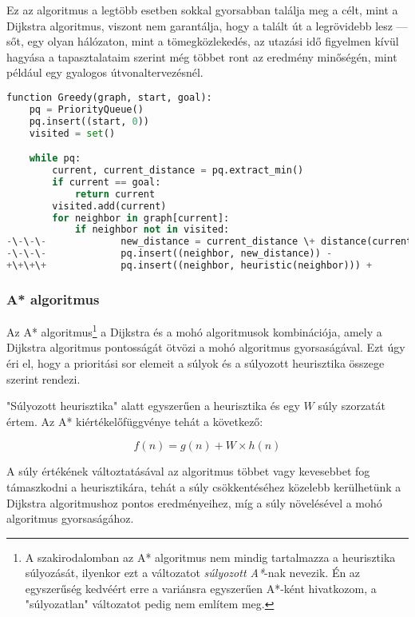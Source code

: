 Ez az algoritmus a legtöbb esetben sokkal gyorsabban találja meg a célt, mint a Dijkstra algoritmus, viszont nem garantálja, hogy a talált út a legrövidebb lesz --- sőt, egy olyan hálózaton, mint a tömegközlekedés, az utazási idő figyelmen kívül hagyása a tapasztalataim szerint még többet ront az eredmény minőségén, mint például egy gyalogos útvonaltervezésnél.

\begin{lstlisting}[language={Python}, style=gitdiff]
function Greedy(graph, start, goal):
    pq = PriorityQueue()
    pq.insert((start, 0))
    visited = set()

    while pq:
        current, current_distance = pq.extract_min()
        if current == goal:
            return current
        visited.add(current)
        for neighbor in graph[current]:
            if neighbor not in visited:
-\-\-\-             new_distance = current_distance \+ distance(current, neighbor) -
-\-\-\-             pq.insert((neighbor, new_distance)) -
+\+\+\+             pq.insert((neighbor, heuristic(neighbor))) +
\end{lstlisting}

\subsubsection{A* algoritmus}

Az A* algoritmus\footnote{A szakirodalomban az A* algoritmus nem mindig tartalmazza a heurisztika súlyozását, ilyenkor ezt a változatot \textit{súlyozott A*}-nak nevezik\cite{russell2020artificial}. Én az egyszerűség kedvéért erre a variánsra egyszerűen A*-ként hivatkozom, a "súlyozatlan" változatot pedig nem említem meg.} a Dijkstra és a mohó algoritmusok kombinációja, amely a Dijkstra algoritmus pontosságát ötvözi a mohó algoritmus gyorsaságával. Ezt úgy éri el, hogy a prioritási sor elemeit a súlyok és a súlyozott heurisztika összege szerint rendezi.

"Súlyozott heurisztika" alatt egyszerűen a heurisztika és egy $W$ súly szorzatát értem. Az A* kiértékelőfüggvénye tehát a következő\cite{russell2020artificial}:

$$f(n) = g(n) + W \times h(n)$$

A súly értékének változtatásával az algoritmus többet vagy kevesebbet fog támaszkodni a heurisztikára, tehát a súly csökkentéséhez közelebb kerülhetünk a Dijkstra algoritmushoz pontos eredményeihez, míg a súly növelésével a mohó algoritmus gyorsaságához.

